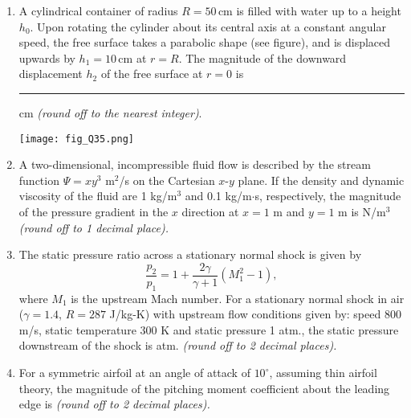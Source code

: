\documentclass[12pt]{article}
\begin{document}
\begin{enumerate}[label=Q.\arabic*, start=26]
	\item A cylindrical container of radius $R = 50\,\text{cm}$ is filled with water up to a height $h_0$. Upon rotating the cylinder about its central axis at a constant angular speed, the free surface takes a parabolic shape (see figure), and is displaced upwards by $h_1 = 10\,\text{cm}$ at $r = R$. The magnitude of the downward displacement $h_2$ of the free surface at $r = 0$ is \rule{1.5cm}{0.15mm} cm \textit{(round off to the nearest integer)}.

		\begin{center}
			\texttt{[image: fig\_Q35.png]} 
		\end{center}
	\item A two-dimensional, incompressible fluid flow is described by the stream function $\Psi = xy^3$ m$^2$/s on the Cartesian $x$-$y$ plane. If the density and dynamic viscosity of the fluid are 1 kg/m$^3$ and 0.1 kg/m$\cdot$s, respectively, the magnitude of the pressure gradient in the $x$ direction at $x=1$ m and $y=1$ m is \underline{\hspace{2cm}} N/m$^3$ \textit{(round off to 1 decimal place).}
	\item The static pressure ratio across a stationary normal shock is given by
		\[
			\frac{p_2}{p_1} = 1 + \frac{2\gamma}{\gamma + 1}(M_1^2 - 1),
		\]
		where $M_1$ is the upstream Mach number. For a stationary normal shock in air ($\gamma = 1.4$, $R = 287$ J/kg-K) with upstream flow conditions given by: speed 800 m/s, static temperature 300 K and static pressure 1 atm., the static pressure downstream of the shock is \underline{\hspace{2cm}} atm. \textit{(round off to 2 decimal places).}

	\item For a symmetric airfoil at an angle of attack of $10^\circ$, assuming thin airfoil theory, the magnitude of the pitching moment coefficient about the leading edge is \underline{\hspace{2cm}} \textit{(round off to 2 decimal places).}


\end{enumerate}
\end{document}
